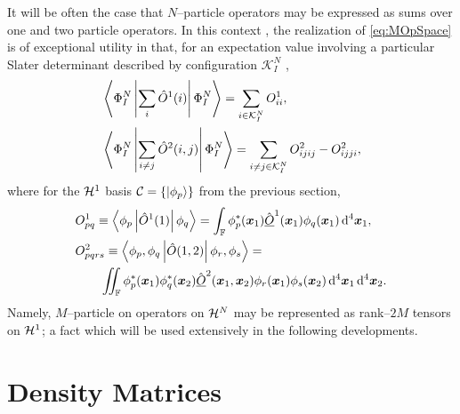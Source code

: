 It will be often the case that $N$--particle operators may be expressed as sums over one and
two particle operators. In this context , the realization of \cref{eq:MOpSpace} is of exceptional utility in that,
for an expectation value involving a particular Slater determinant described by configuration $\mathcal{K}_I^N$
\cite{Ostlund12_book},
\begin{subequations}
  \label{eq:SlaterCondon}
\begin{align}
  &\left\langle \Phi^N_I \left\vert \sum_i\hat{O}^1(i) \right\vert \Phi^N_I \right\rangle = \sum_{i\in\mathcal{K}^N_I} O^1_{ii},\\
  &\left\langle \Phi^N_I \left\vert \sum_{i\neq j} \hat{O}^2(i,j) \right\vert \Phi^N_I \right\rangle = 
    \sum_{i\neq j \in\mathcal{K}^N_I} O^2_{ijij} - O^2_{ijji},
\end{align}
\end{subequations}
where for the $\mathcal{H}^1$ basis $\mathcal{C} = \left \lbrace \left\vert \phi_p \right\rangle \right\rbrace$ from the previous section,
\begin{subequations}
  \label{eq:DiracInts}
\begin{align}
  &O^1_{pq} \equiv \left\langle \phi_p \left\vert \hat{O}^1(1) \right\vert \phi_q \right\rangle = 
    \int_{\mathbb F} \phi_p^*(\boldsymbol{x}_1) \hat{\underline{O}}^1(\boldsymbol{x}_1) \phi_q(\boldsymbol{x}_1) \,\mathrm{d}^4 \boldsymbol{x}_1,\\
  &O^2_{pqrs} \equiv \left\langle \phi_p, \phi_q  \left\vert \hat{O}(1,2) \right\vert \phi_r, \phi_s \right\rangle = \nonumber \\ &\qquad
    \int\mkern-12mu\int_{\mathbb F} 
      \phi_p^*(\boldsymbol{x}_1) \phi_q^*(\boldsymbol{x}_2) \hat{\underline{O}}^2(\boldsymbol{x}_1,\boldsymbol{x}_2) 
      \phi_r(\boldsymbol{x}_1) \phi_s(\boldsymbol{x}_2) \,\mathrm{d}^4 \boldsymbol{x}_1 \,\mathrm{d}^4 \boldsymbol{x}_2.
\end{align}
\end{subequations}
Namely, $M$--particle on operators on $\mathcal{H}^N$ may be represented as rank--$2M$ tensors on $\mathcal{H}^1$; a fact which will
be used extensively in the following developments.


\section{Density Matrices}
\label{sec:DenMat}


